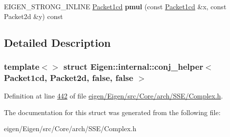 \begin{DoxyCompactItemize}
\item 
\mbox{\label{struct_eigen_1_1internal_1_1conj__helper_3_01_packet1cd_00_01_packet2d_00_01false_00_01false_01_4_a3180e39d0a8f233420ef8fd3e5d26746}} 
E\+I\+G\+E\+N\+\_\+\+S\+T\+R\+O\+N\+G\+\_\+\+I\+N\+L\+I\+NE \hyperlink{struct_eigen_1_1internal_1_1_packet1cd}{Packet1cd} {\bfseries pmul} (const \hyperlink{struct_eigen_1_1internal_1_1_packet1cd}{Packet1cd} \&x, const Packet2d \&y) const
\end{DoxyCompactItemize}


\subsection{Detailed Description}
\subsubsection*{template$<$$>$\newline
struct Eigen\+::internal\+::conj\+\_\+helper$<$ Packet1cd, Packet2d, false, false $>$}



Definition at line \hyperlink{eigen_2_eigen_2src_2_core_2arch_2_s_s_e_2_complex_8h_source_l00442}{442} of file \hyperlink{eigen_2_eigen_2src_2_core_2arch_2_s_s_e_2_complex_8h_source}{eigen/\+Eigen/src/\+Core/arch/\+S\+S\+E/\+Complex.\+h}.



The documentation for this struct was generated from the following file\+:\begin{DoxyCompactItemize}
\item 
eigen/\+Eigen/src/\+Core/arch/\+S\+S\+E/\+Complex.\+h\end{DoxyCompactItemize}
